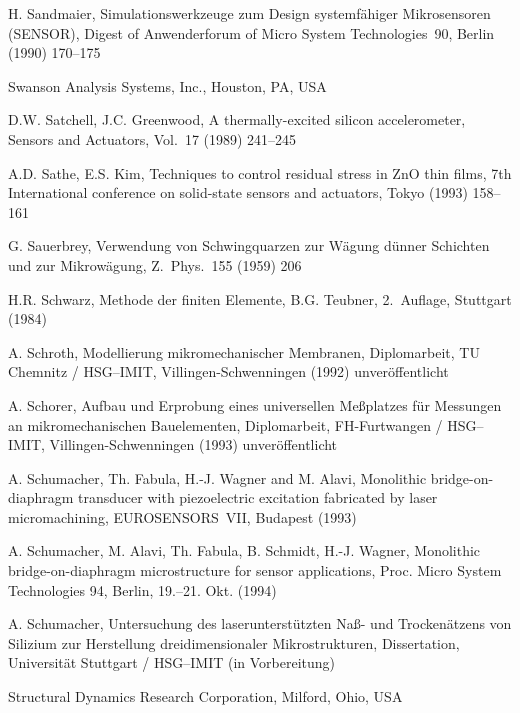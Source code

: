 \begin{thebibliography}{xxx}
 H. Sandmaier, Simulationswerkzeuge zum Design systemfähiger Mikrosensoren
 ({\sf SENSOR}), Digest of Anwenderforum of Micro System Technologies~90,
 Berlin (1990) 170--175

 Swanson Analysis Systems, Inc., Houston, PA, USA

 D.W. Satchell, J.C. Greenwood, A thermally-excited silicon accelerometer,
 Sensors and Actuators, Vol.~17 (1989) 241--245

 A.D. Sathe, E.S. Kim, Techniques to control residual stress in ZnO thin
 films, 7th International conference on solid-state sensors and actuators,
 Tokyo (1993) 158--161

 G. Sauerbrey, Verwendung von Schwingquarzen zur Wägung dünner Schichten und
 zur Mikrowägung, Z.~Phys.~155 (1959) 206

 H.R. Schwarz, Methode der finiten Elemente, B.G. Teubner, 2.~Auflage,
 Stuttgart (1984)

 A. Schroth, Modellierung mikromechanischer Membranen, Diplomarbeit,
 TU Chemnitz / HSG--IMIT, Villingen-Schwenningen (1992) unveröffentlicht

 A. Schorer, Aufbau und Erprobung eines universellen Meßplatzes für
 Messungen an mikromechanischen Bauelementen, Diplomarbeit,
 FH-Furtwangen / HSG--IMIT, Villingen-Schwenningen (1993) unveröffentlicht

 A. Schumacher, Th. Fabula, H.-J. Wagner and M. Alavi,
 Monolithic bridge-on-diaphragm transducer with piezoelectric excitation
 fabricated by laser micromachining, EUROSENSORS~VII, Budapest (1993)

 A. Schumacher, M. Alavi, Th. Fabula, B. Schmidt, H.-J. Wagner,
 Monolithic bridge-on-diaphragm microstructure for sensor applications,
 Proc. Micro System Technologies 94, Berlin, 19.--21. Okt. (1994)

 A. Schumacher, Untersuchung des laserunterstützten Naß- und Trockenätzens
 von Silizium zur Herstellung dreidimensionaler Mikrostrukturen,
 Dissertation, Universität Stuttgart / HSG--IMIT (in Vorbereitung)

 Structural Dynamics Research Corporation, Milford, Ohio, USA


\end{thebibliography}
